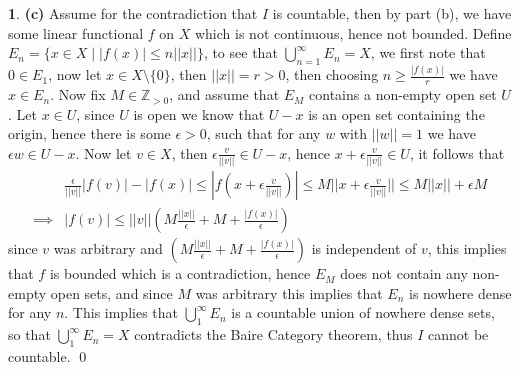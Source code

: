 \documentclass[11pt]{article}
\theoremstyle{definition}
\newtheorem{pb}{}
\newcommand{\set}[1]{\{#1\}}
\newcommand{\abs}[1]{\left\vert#1\right\vert}
\newcommand{\norm}[1]{\lvert\lvert#1\rvert\rvert}
\begin{document}
\begin{pb}
        \textbf{(c)} Assume for the contradiction that \(I\) is countable, then by part (b), we have some linear functional \(f\) on \(X\) which is not continuous, hence not bounded. Define \(E_n = \set{x \in X \mid \abs{f(x)} \leq n\norm{x}}\), to see that \(\bigcup_{n=1}^\infty E_n = X\), we first note that \(0 \in E_1\), now let \(x \in X\setminus \set{0}\), then \(\norm{x} = r > 0\), then choosing \(n \geq \frac{\abs{f(x)}}{r}\) we have \(x \in E_n\). Now fix \(M \in \mathbb{Z}_{>0}\), and assume that \(E_M\) contains a non-empty open set \(U\). Let \(x \in U\), since \(U\) is open we know that \(U - x\) is an open set containing the origin, hence there is some \(\epsilon > 0\), such that for any \(w\) with \(\norm{w} = 1\) we have \(\epsilon w \in U - x\). Now let \(v \in X\), then \(\epsilon\frac{v}{\norm{v}} \in U - x\), hence \(x + \epsilon\frac{v}{\norm{v}} \in U\), it follows that \begin{align*}
            &\frac{\epsilon}{\norm{v}} \abs{f(v)} - \abs{f(x)} \leq \abs{f(x + \epsilon\frac{v}{\norm{v}})} \leq M \norm{x + \epsilon\frac{v}{\norm{v}}} \leq M\norm{x} + \epsilon M \\
            \implies &\abs{f(v)} \leq \norm{v}\left(M\frac{\norm{x}}{\epsilon} + M + \frac{\abs{f(x)}}{\epsilon}\right)
        \end{align*}
        since \(v\) was arbitrary and \(\left(M\frac{\norm{x}}{\epsilon} + M + \frac{\abs{f(x)}}{\epsilon}\right)\) is independent of \(v\), this implies that \(f\) is bounded which is a contradiction, hence \(E_M\) does not contain any non-empty open sets, and since \(M\) was arbitrary this implies that \(E_n\) is nowhere dense for any \(n\). This implies that \(\bigcup_1^\infty E_n\) is a countable union of nowhere dense sets, so that \(\bigcup_1^\infty E_n = X\) contradicts the Baire Category theorem, thus \(I\) cannot be countable. \qed
    \end{pb}
\end{document}

